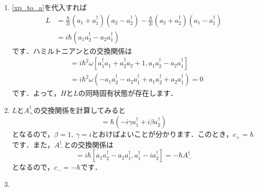 \documentclass[a4paper,pdflatex,ja=standard]{bxjsarticle}
\begin{document}
\begin{enumerate}
  \item 

  \eqref{xp_to_a}を代入すれば
  \begin{align}
    L
    &=
    \frac{\hbar}{2i}
    (a_1+a_1^{\dag})(a_2-a_2^{\dag})
    -
    \frac{\hbar}{2i}
    (a_2+a_2^{\dag})(a_1-a_1^{\dag})
    \nonumber
    \\
    &=
    i\hbar(a_1a_2^{\dag}-a_2a_1^{\dag})
  \end{align}
  です．ハミルトニアンとの交換関係は
  \begin{align}
    [H,L]
    &=
    i\hbar^2\omega
    [
      a_1^{\dag}a_1+a_2^{\dag}a_2+1
      ,
      a_1a_2^{\dag}-a_2a_1^{\dag}
    ]
    \nonumber
    \\  
    &=
    i\hbar^2\omega
    (
      -a_1a_2^{\dag}-a_2a_1^{\dag}+a_1a_2^{\dag}+a_2a_1^{\dag}
    )
    =
    0
  \end{align}
  です．よって，$H$と$L$の同時固有状態が存在します．


  \item 

  $L$と$A_{+}^{\dag}$の交換関係を計算してみると
  \begin{equation}
    [L,A_{+}^{\dag}]
    =
    \hbar
    (
      -i\gamma a_1^{\dag}
      +
      i\beta a_2^{\dag}
    )
  \end{equation}
  となるので，$\beta=1,\ \gamma=i$とおけばよいことが分かります．このとき，$c_{+}=\hbar$です．また，$A_{-}^{\dag}$との交換関係は
  \begin{equation}
    [L,A_{-}^{\dag}]
    =
    i\hbar[a_1a_2^{\dag}-a_2a_1^{\dag},a_1^{\dag}-ia_2^{\dag}]
    =
    -\hbar A_{-}^{\dag}
  \end{equation}
  となるので，$c_{-}=-\hbar$です．


  \item 


\end{enumerate}
\end{document}
